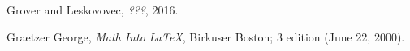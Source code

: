 \documentclass{article}
\begin{document}
 

\begin{thebibliography}{10}

   Grover and Leskovovec, 
  \emph{???}, 2016.
  
   Graetzer George, \emph{Math Into \LaTeX},
  Birkuser Boston; 3 edition (June 22, 2000).
  
\end{thebibliography}
  
\end{document}
